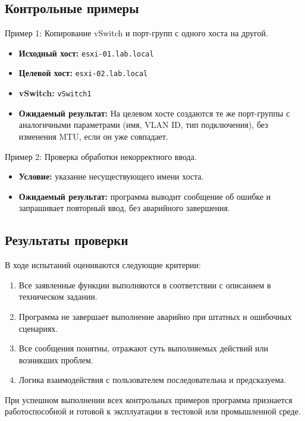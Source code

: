 \subsection{Контрольные примеры}

Пример 1: Копирование vSwitch и порт-групп с одного хоста на другой.

\begin{itemize}
  \item \textbf{Исходный хост:} \texttt{esxi-01.lab.local}
  \item \textbf{Целевой хост:} \texttt{esxi-02.lab.local}
  \item \textbf{vSwitch:} \texttt{vSwitch1}
  \item \textbf{Ожидаемый результат:} На целевом хосте создаются те же порт-группы с аналогичными параметрами (имя, VLAN ID, тип подключения), без изменения MTU, если он уже совпадает.
\end{itemize}

Пример 2: Проверка обработки некорректного ввода.

\begin{itemize}
  \item \textbf{Условие:} указание несуществующего имени хоста.
  \item \textbf{Ожидаемый результат:} программа выводит сообщение об ошибке и запрашивает повторный ввод, без аварийного завершения.
\end{itemize}

\subsection{Результаты проверки}

В ходе испытаний оцениваются следующие критерии:
\begin{enumerate}
  \item Все заявленные функции выполняются в соответствии с описанием в техническом задании.
  \item Программа не завершает выполнение аварийно при штатных и ошибочных сценариях.
  \item Все сообщения понятны, отражают суть выполняемых действий или возникших проблем.
  \item Логика взаимодействия с пользователем последовательна и предсказуема.
\end{enumerate}

При успешном выполнении всех контрольных примеров программа признается работоспособной и готовой к эксплуатации в тестовой или промышленной среде.

